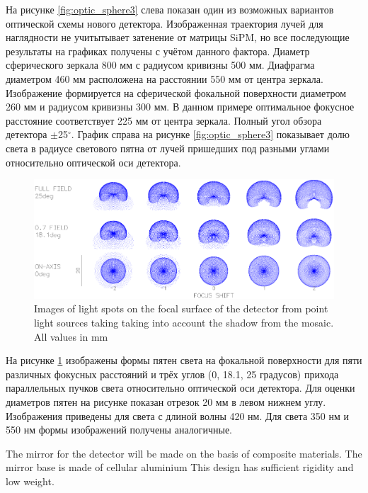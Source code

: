 \documentclass[a4paper,11pt]{article}
\begin{document}
На рисунке \ref{fig:optic_sphere3} слева показан один из возможных вариантов оптической схемы нового детектора.
Изображенная траектория лучей для наглядности не учитытывает затенение от матрицы SiPM, но все последующие результаты на графиках получены с учётом данного фактора. 
Диаметр сферического зеркала 800 мм с радиусом кривизны 500 мм.
Диафрагма диаметром 460 мм расположена на расстоянии 550 мм от центра зеркала.
Изображение формируется на сферической фокальной поверхности диаметром 260 мм и радиусом кривизны 300 мм. В данном примере оптимальное фокусное расстояние соответствует 225 мм от центра зеркала.
Полный угол обзора детектора $\pm$25$^\circ$.
График справа на рисунке \ref{fig:optic_sphere3} показывает долю света в радиусе светового пятна от лучей пришедших под разными углами относительно оптической оси детектора.

\begin{figure}[htbp]
\centering
\includegraphics[width=.8\textwidth,trim=0 0 0 0,clip]{Sphere3spot.png}
\caption{\label{fig:spots} Images of light spots on the focal surface of the detector from point light sources taking taking into account the shadow from the mosaic. All values in mm}
\end{figure}

На рисунке \ref{fig:spots} изображены формы пятен света на фокальной поверхности для пяти различных фокусных расстояний и трёх углов (0, 18.1, 25 градусов) прихода параллельных пучков света относительно оптической оси детектора. Для оценки диаметров пятен на рисунке показан отрезок 20 мм в левом нижнем углу. Изображения приведены для света с длиной волны 420 нм. Для света 350 нм и 550 нм формы изображений получены аналогичные.      

The mirror for the detector will be made on the basis of composite materials.
The mirror base is made of cellular aluminium This design has sufficient rigidity and low weight.
\end{document}
